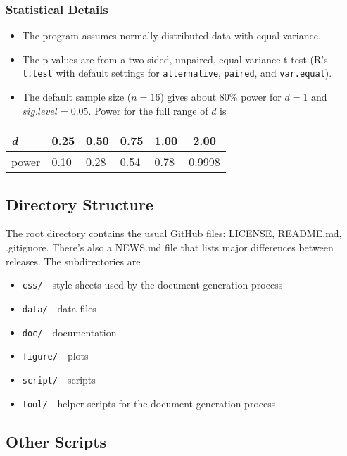 \documentclass[]{article}
\providecommand{\tightlist}{%
  \setlength{\itemsep}{0pt}\setlength{\parskip}{0pt}}
\begin{document}
\subsubsection{Statistical Details}\label{statistical-details}

\begin{itemize}
\tightlist
\item
  The program assumes normally distributed data with equal variance.
\item
  The p-values are from a two-sided, unpaired, equal variance t-test
  (R's \texttt{t.test} with default settings for \texttt{alternative},
  \texttt{paired}, and \texttt{var.equal}).
\item
  The default sample size (\(n=16\)) gives about 80\% power for \(d=1\)
  and \(sig.level=0.05\). Power for the full range of \(d\) is
\end{itemize}

\begin{longtable}[]{@{}lllllc@{}}
\toprule
\emph{d} & 0.25 & 0.50 & 0.75 & 1.00 & 2.00\tabularnewline
\midrule
\endhead
power & 0.10 & 0.28 & 0.54 & 0.78 & 0.9998\tabularnewline
\bottomrule
\end{longtable}

\subsection{Directory Structure}\label{directory-structure}

The root directory contains the usual GitHub files: LICENSE, README.md,
.gitignore. There's also a NEWS.md file that lists major differences
between releases. The subdirectories are

\begin{itemize}
\tightlist
\item
  \texttt{css/} - style sheets used by the document generation process
\item
  \texttt{data/} - data files
\item
  \texttt{doc/} - documentation
\item
  \texttt{figure/} - plots
\item
  \texttt{script/} - scripts
\item
  \texttt{tool/} - helper scripts for the document generation process
\end{itemize}

\subsection{Other Scripts}\label{other-scripts}
\end{document}
